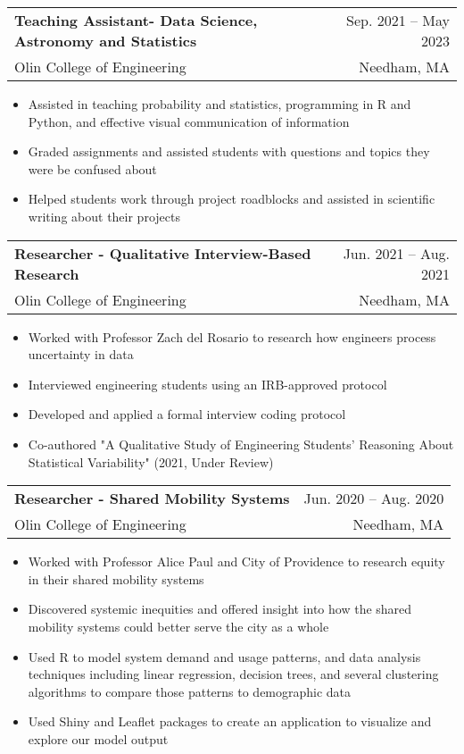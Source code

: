 \documentclass[letterpaper,11pt]{article}
\makeatletter
\newcommand{\resumeItem}[1]{
  \item\small{
    {#1\vspace{-2pt}}
  }
}
\newcommand{\resumeSubheading}[4]{
  \vspace{-2pt}\item
    \begin{tabular*}{0.97\textwidth}[t]{l@{\extracolsep{\fill}}r}
      \textbf{#1} & #2 \\
      \small#3 & \small #4 \\
    \end{tabular*}\vspace{-7pt}
}
\newcommand{\resumeItemListStart}{\begin{itemize}}
\newcommand{\resumeItemListEnd}{\end{itemize}\vspace{-5pt}}
\makeatother
\begin{document}


    \resumeSubheading
      {Teaching Assistant- Data Science, Astronomy and Statistics}{Sep. 2021 -- May 2023}
      {Olin College of Engineering}{Needham, MA}
      \resumeItemListStart
        \resumeItem{Assisted in teaching probability and statistics, programming in R and Python, and effective visual communication of information}
        \resumeItem{Graded assignments and assisted students with questions and topics they were be confused about}
        \resumeItem{Helped students work through project roadblocks and assisted in scientific writing about their projects}
    \resumeItemListEnd

    \resumeSubheading
      {Researcher - Qualitative Interview-Based Research}{Jun. 2021 -- Aug. 2021}
      {Olin College of Engineering}{Needham, MA}
      \resumeItemListStart
        \resumeItem{Worked with Professor Zach del Rosario to research how engineers process uncertainty in data}
        \resumeItem{Interviewed engineering students using an IRB-approved protocol}
        \resumeItem{Developed and applied a formal interview coding protocol}
        \resumeItem{Co-authored "A Qualitative Study of Engineering Students’ Reasoning About Statistical Variability" (2021, Under Review)}
    \resumeItemListEnd

    \resumeSubheading
      {Researcher - Shared Mobility Systems}{Jun. 2020 -- Aug. 2020}
      {Olin College of Engineering}{Needham, MA}
      \resumeItemListStart
        \resumeItem{Worked with Professor Alice Paul and City of Providence to research equity in their shared mobility systems}
        \resumeItem{Discovered systemic inequities and offered insight into how the shared mobility systems could better serve the city as a whole}
        \resumeItem{Used R to model system demand and usage patterns, and data analysis techniques including linear regression, decision trees, and several clustering algorithms to compare those patterns to demographic data}
        \resumeItem{Used Shiny and Leaflet packages to create an application to visualize and explore our model output}
    \resumeItemListEnd
\end{document}
